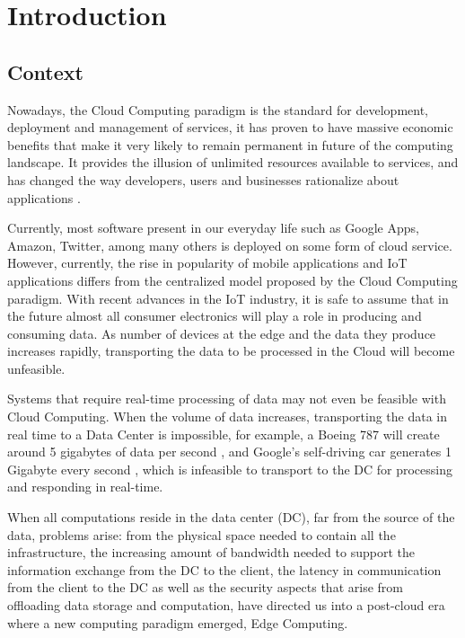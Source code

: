 \newcommand{\novathesis}{\emph{novathesis}}
\newcommand{\novathesisclass}{\texttt{novathesis.cls}}


\chapter{Introduction}
\label{cha:introduction}

\section{Context}

Nowadays, the Cloud Computing paradigm is the standard for development, deployment and management of services, it has proven to have massive economic benefits that make it very likely to remain permanent in future of the computing landscape. It provides the illusion of unlimited resources available to services, and has changed the way developers, users and businesses rationalize about  applications \cite{10.1145/1721654.1721672}.

Currently, most software present in our everyday life such as Google Apps,
Amazon, Twitter, among many others is deployed on some form of cloud service. However, currently, the rise in popularity of mobile applications and IoT applications differs from the centralized model proposed by the Cloud Computing paradigm. With recent advances in the IoT
industry, it is safe to assume that in the future almost all consumer electronics will play a role in producing and consuming data. As number of devices at the edge and the data they produce increases rapidly, transporting the data to be processed in the Cloud will become unfeasible. 

Systems that require real-time processing of data may not even be feasible with Cloud Computing. When the volume of data increases, transporting the data in real time to a Data Center is impossible, for example, a  Boeing 787 will create around 5 gigabytes of data per second \cite{finnegan_2013}, and Google's self-driving car generates 1 Gigabyte every second \cite{datafloq}, which is infeasible to transport to the DC for processing and responding in real-time. 

When all computations reside in the data center (DC), far from the source of the data, problems arise: from the physical space needed to contain all the infrastructure, the increasing amount of bandwidth needed to support the information exchange from the DC to the client, the latency in communication from the client to the DC as well as the security aspects that arise from offloading data storage and computation, have directed us into a post-cloud era where a new computing paradigm emerged, Edge Computing. 

